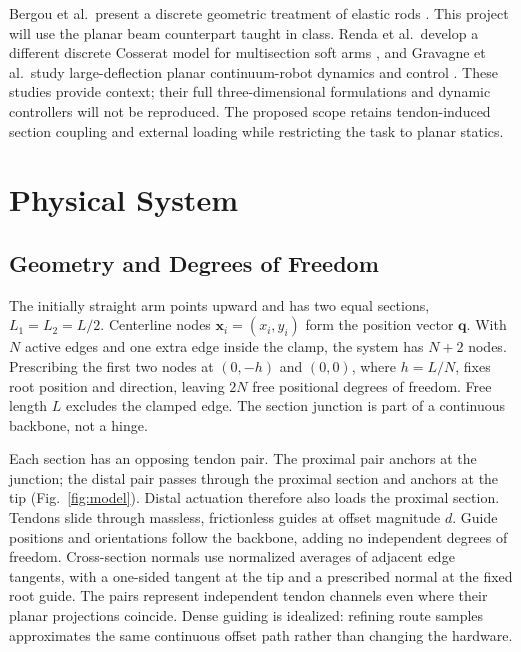 \documentclass[letterpaper,10pt,conference]{ieeeconf}
\newcommand{\vct}[1]{\boldsymbol{#1}}
\begin{document}
Bergou et al.\ present a discrete geometric treatment of elastic rods
\cite{bergou}. This project will use the planar beam counterpart taught
in class. Renda et al.\ develop a different discrete Cosserat model for
multisection soft arms \cite{renda}, and Gravagne et al.\ study
large-deflection planar continuum-robot dynamics and control
\cite{gravagne}. These studies provide context; their full
three-dimensional formulations and dynamic controllers will not be
reproduced. The proposed scope retains tendon-induced section coupling
and external loading while restricting the task to planar statics.

\section{Physical System}
\subsection{Geometry and Degrees of Freedom}
The initially straight arm points upward and has two equal sections,
$L_1=L_2=L/2$. Centerline nodes $\vct{x}_i=(x_i,y_i)$ form the
position vector $\vct{q}$. With $N$ active edges and one extra edge
inside the clamp, the system has $N+2$ nodes. Prescribing the first
two nodes at $(0,-h)$ and $(0,0)$, where $h=L/N$, fixes root position and direction,
leaving $2N$ free positional degrees of freedom. Free length $L$
excludes the clamped edge. The section junction is part of a continuous
backbone, not a hinge.

Each section has an opposing tendon pair. The proximal pair anchors
at the junction; the distal pair passes through the proximal section
and anchors at the tip (Fig.~\ref{fig:model}). Distal actuation therefore
also loads the proximal section. Tendons slide through massless,
frictionless guides at offset magnitude $d$. Guide positions and
orientations follow the backbone, adding no independent degrees of
freedom. Cross-section normals use normalized averages of adjacent
edge tangents, with a one-sided tangent at the tip and a prescribed
normal at the fixed root guide. The pairs represent independent tendon
channels even where their planar projections coincide. Dense guiding
is idealized: refining route samples approximates the same continuous
offset path rather than changing the hardware.
\end{document}
